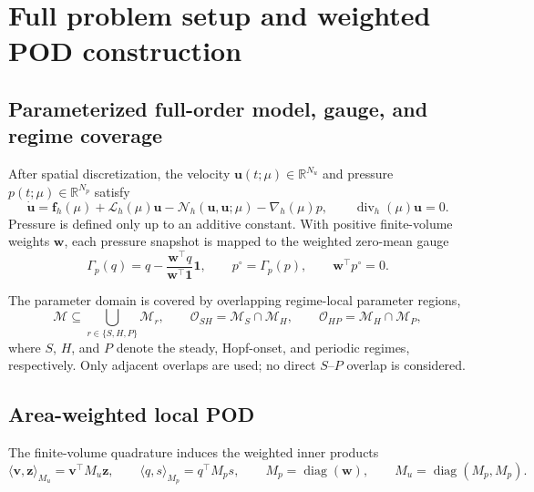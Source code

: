 \documentclass{article}
\begin{document}



\appendix
\section{Full problem setup and weighted POD construction}
\label{app:problem_pod}

\subsection{Parameterized full-order model, gauge, and regime coverage}

After spatial discretization, the velocity
$\bm u(t;\mu)\in\mathbb R^{N_u}$ and pressure
$p(t;\mu)\in\mathbb R^{N_p}$ satisfy
\begin{equation}
    \dot{\bm u}
    =
    \bm f_h(\mu)
    +\mathcal L_h(\mu)\bm u
    -\mathcal N_h(\bm u,\bm u;\mu)
    -\nabla_h(\mu)p,
    \qquad
    \operatorname{div}_h(\mu)\bm u=0.
    \label{eq:app_fom}
\end{equation}
Pressure is defined only up to an additive constant.
With positive finite-volume weights $\bm w$, each pressure snapshot is mapped
to the weighted zero-mean gauge
\begin{equation}
    \Gamma_p(q)
    =
    q-\frac{\bm w^\top q}{\bm w^\top\bm 1}\bm 1,
    \qquad
    p^\circ=\Gamma_p(p),
    \qquad
    \bm w^\top p^\circ=0.
    \label{eq:app_pressure_gauge}
\end{equation}

The parameter domain is covered by overlapping regime-local parameter regions,
\begin{equation}
    \mathcal M
    \subseteq
    \bigcup_{r\in\{S,H,P\}}\mathcal M_r,
    \qquad
    \mathcal O_{SH}
    =
    \mathcal M_S\cap\mathcal M_H,
    \qquad
    \mathcal O_{HP}
    =
    \mathcal M_H\cap\mathcal M_P,
    \label{eq:app_regime_cover}
\end{equation}
where $S$, $H$, and $P$ denote the steady, Hopf-onset, and periodic
regimes, respectively.
Only adjacent overlaps are used; no direct $S$--$P$ overlap is considered.


\subsection{Area-weighted local POD}

The finite-volume quadrature induces the weighted inner products
\begin{equation}
    \langle\bm v,\bm z\rangle_{M_u}
    =
    \bm v^\top M_u\bm z,
    \qquad
    \langle q,s\rangle_{M_p}
    =
    q^\top M_p s,
    \qquad
    M_p=\operatorname{diag}(\bm w),
    \qquad
    M_u=\operatorname{diag}(M_p,M_p).
    \label{eq:app_weighted_inner_products}
\end{equation}
\end{document}
